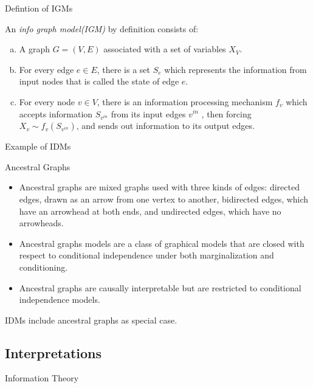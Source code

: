 \documentclass[10pt]{beamer}
\begin{document}
\begin{CJK*}{UTF8}{gbsn}
\begin{frame}{Defintion of IGMs}
\begin{definition}
    An \emph{info graph model(IGM)} by definition consists of:
    \begin{enumerate}[a)]
        \item  A graph $G = (V, E)$ associated with a set of variables $X_V$. 
        \item  For every edge $e \in E$, there is a set $S_e$ which represents the  information from input nodes that is called the state of edge $e$. 
        \item  For every node $v \in V$, there is an information processing mechanism $f_v$ which accepts information $S_{v^{in}}$ from its input edges ${v^{in}}$ , then forcing $X_v \sim f_v(S_{v^{in}})$, and sends out information to its output edges. 
    \end{enumerate}  
\end{definition}
\end{frame}

\begin{frame}{Example of IDMs}
    \begin{exampleblock}{Ancestral Graphs}
        \begin{itemize}
            \item  Ancestral graphs are mixed graphs used with three kinds of edges: directed edges, drawn as an arrow from one vertex to another, bidirected edges, which have an arrowhead at both ends, and undirected edges, which have no arrowheads.
            \item Ancestral graphs models are a class of graphical models that are closed with respect to conditional independence under both marginalization and conditioning. 
            \item Ancestral graphs are causally interpretable but are restricted to conditional independence models. 
        \end{itemize}
        IDMs include ancestral graphs as special case.
    \end{exampleblock}
    
\end{frame}

\subsection{Interpretations}

\begin{frame}{Information Theory}


\end{frame}
\end{CJK*}
\end{document}
